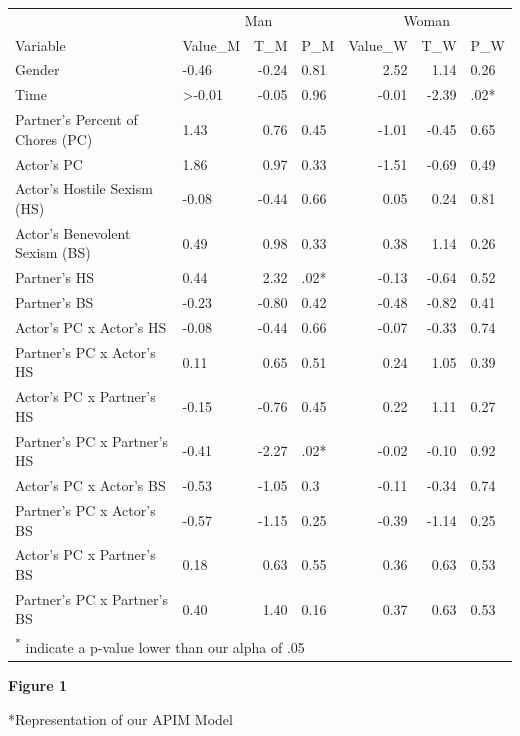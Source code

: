 \documentclass[
  man]{apa6}
\begin{document}
\begin{tabular}{l|l|r|l|r|r|l}
\hline
\multicolumn{1}{c|}{ } & \multicolumn{3}{c|}{Man} & \multicolumn{3}{c}{Woman} \\
\cline{2-4} \cline{5-7}
Variable & Value\_M & T\_M & P\_M & Value\_W & T\_W & P\_W\\
\hline
Gender & -0.46 & -0.24 & 0.81 & 2.52 & 1.14 & 0.26\\
\hline
Time & >-0.01 & -0.05 & 0.96 & -0.01 & -2.39 & .02*\\
\hline
Partner's Percent of Chores (PC) & 1.43 & 0.76 & 0.45 & -1.01 & -0.45 & 0.65\\
\hline
Actor's PC & 1.86 & 0.97 & 0.33 & -1.51 & -0.69 & 0.49\\
\hline
Actor's Hostile Sexism (HS) & -0.08 & -0.44 & 0.66 & 0.05 & 0.24 & 0.81\\
\hline
Actor's Benevolent Sexism (BS) & 0.49 & 0.98 & 0.33 & 0.38 & 1.14 & 0.26\\
\hline
Partner's HS & 0.44 & 2.32 & .02* & -0.13 & -0.64 & 0.52\\
\hline
Partner's BS & -0.23 & -0.80 & 0.42 & -0.48 & -0.82 & 0.41\\
\hline
Actor's PC x Actor's HS & -0.08 & -0.44 & 0.66 & -0.07 & -0.33 & 0.74\\
\hline
Partner's PC x Actor's HS & 0.11 & 0.65 & 0.51 & 0.24 & 1.05 & 0.39\\
\hline
Actor's PC x Partner's HS & -0.15 & -0.76 & 0.45 & 0.22 & 1.11 & 0.27\\
\hline
Partner's PC x Partner's HS & -0.41 & -2.27 & .02* & -0.02 & -0.10 & 0.92\\
\hline
Actor's PC x Actor's BS & -0.53 & -1.05 & 0.3 & -0.11 & -0.34 & 0.74\\
\hline
Partner's PC x Actor's BS & -0.57 & -1.15 & 0.25 & -0.39 & -1.14 & 0.25\\
\hline
Actor's PC x Partner's BS & 0.18 & 0.63 & 0.55 & 0.36 & 0.63 & 0.53\\
\hline
Partner's PC x Partner's BS & 0.40 & 1.40 & 0.16 & 0.37 & 0.63 & 0.53\\
\hline
\multicolumn{7}{l}{\textsuperscript{*} indicate a p-value lower than our alpha of .05}\\
\end{tabular}

\textbf{Figure 1}

*Representation of our APIM Model
\end{document}
